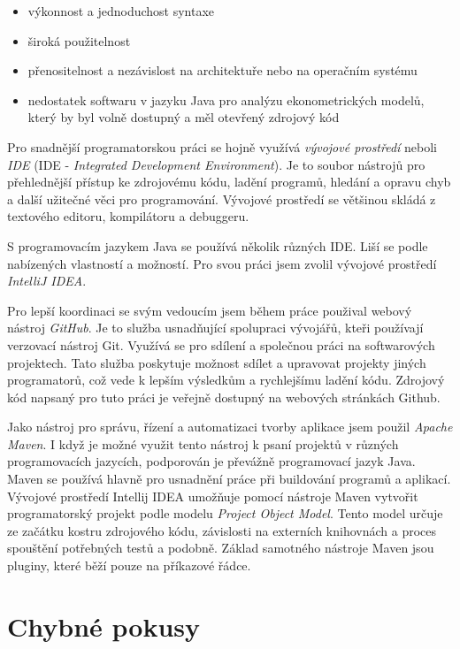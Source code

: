 \documentclass[a4paper,12pt,twoside]{scrreprt}
\begin{document}
\begin{itemize}
\item výkonnost a jednoduchost syntaxe
\item široká použitelnost
\item přenositelnost a nezávislost na architektuře nebo na operačním systému
\item nedostatek softwaru v jazyku Java pro analýzu ekonometrických modelů, který by byl volně dostupný a měl otevřený zdrojový kód
\end{itemize} 

Pro snadnější programatorskou práci se hojně využívá \textit{vývojové prostředí} neboli \textit{IDE} (IDE - \textit{Integrated Development Environment}). Je to soubor nástrojů pro přehlednější přístup ke zdrojovému kódu, ladění programů, hledání a opravu chyb a další užitečné věci pro programování. Vývojové prostředí se většinou skládá z textového editoru, kompilátoru a debuggeru. 

S programovacím jazykem Java se používá několik různých IDE. Liší se podle nabízených vlastností a možností. Pro svou práci jsem zvolil vývojové prostředí \textit{IntelliJ IDEA}. 

Pro lepší koordinaci se svým vedoucím jsem během práce použival webový nástroj \textit{GitHub}. Je to služba usnadňující spolupraci vývojářů, kteři používají verzovací nástroj Git. Využívá se pro sdílení a společnou práci na softwarových projektech. Tato služba poskytuje možnost sdílet a upravovat projekty jiných programatorů, což vede k lepším výsledkům a rychlejšímu ladění kódu. Zdrojový kód napsaný pro tuto práci je veřejně dostupný na webových stránkách Github.

Jako nástroj pro správu, řízení a automatizaci tvorby aplikace jsem použil \textit{Apache Maven}. I když je možné využit tento nástroj k psaní projektů v různých programovacích jazycích, podporován je převážně programovací jazyk Java. Maven se používá hlavně pro usnadnění práce při buildování programů a aplikací. Vývojové prostředí Intellij IDEA umožňuje pomocí nástroje Maven vytvořit programatorský projekt podle modelu \textit{Project Object Model}. Tento model určuje ze začátku kostru zdrojového kódu, závislosti na externích knihovnách a proces spouštění potřebných testů a podobně. Základ samotného nástroje Maven jsou pluginy, které běží pouze na příkazové řádce. 

\newpage
\section{Chybné pokusy}
\vspace{0.5cm}
\end{document}
